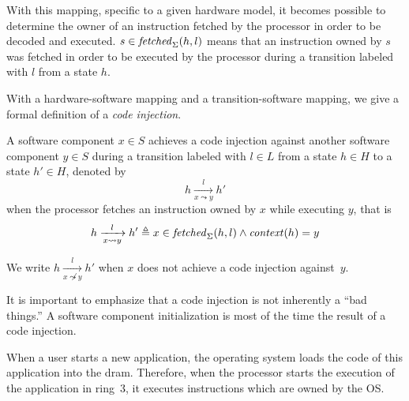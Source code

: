 With this mapping, specific to a given hardware model, it becomes possible to
determine the owner of an instruction fetched by the processor in order to be
decoded and executed.
%
\( s \in \mathit{fetched}_{\Sigma}(h, l) \) means that an instruction owned by $s$
was fetched in order to be executed by the processor during a transition labeled
with \( l \) from a state \( h \). 

With a hardware-software mapping and a transition-software mapping, we give a
formal definition of a \textit{code injection}.

%

\begin{definition}
  \label{def:speccert:tempering}
  A software component $x \in S$ achieves a code injection against another
  software component $y \in S$ during a transition labeled with $l \in L$ from a
  state $h \in H$ to a state $h' \in H$, denoted by
  \[
    h \xrightarrow[x \leadsto y]{l} h'
  \]
  when the processor fetches an instruction owned by $x$ while executing $y$,
  that is
  \[
    h \xrightarrow[x \leadsto y]{l} h' \triangleq x \in
    \mathit{fetched}_{\Sigma}(h, l) \wedge \mathit{context}(h) = y
  \]

  We write $h \xrightarrow[x \not\leadsto y]{l} h'$ when $x$ does not achieve a
  code injection against~$y$.
\end{definition}

It is important to emphasize that a code injection is not inherently a ``bad
things.''
%
A software component initialization is most of the time the result of a code
injection.

\begin{example}
  When a user starts  a new application, the operating system
  loads the code of this application into the \ac{dram}.
  Therefore, when the processor starts the execution of the application in
  ring~3, it executes instructions which are owned by the OS.
\end{example}

